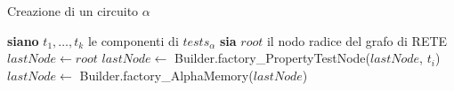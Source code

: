 
\begin{algorithm}
\caption{Creazione di un circuito $\alpha$}\label{alg:builder-makeAlpha}
\begin{algorithmic}
\State \textbf{siano} $t_1,\dots,t_k$ le componenti di $tests_\alpha$
\State \textbf{sia} $root$ il nodo radice del grafo di RETE
\State $lastNode\gets root$
	\State $lastNode\gets$ Builder.factory\_PropertyTestNode($lastNode$, $t_i$)
\EndFor
\State $lastNode\gets$ Builder.factory\_AlphaMemory($lastNode$)
\State {}
\EndFunction
\end{algorithmic}
\end{algorithm}

